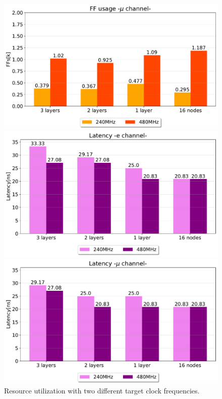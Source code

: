 \documentclass[../../main.tex]{subfiles}
\begin{document}
\begin{figure}[ht]
\begin{minipage}[b]{0.5\linewidth}
    \vspace{4ex}
  \end{minipage}%
  \begin{minipage}[b]{0.5\linewidth}
    \centering
    \includegraphics[width=.82\linewidth]{sections/05/Images/FF_usage1mu_@480.pdf} 
    \vspace{4ex}
  \end{minipage}
  \begin{minipage}[b]{0.5\linewidth}
    \centering
    \includegraphics[width=.82\linewidth]{sections/05/Images/Latency_1ele_@480.pdf} 
    \vspace{4ex}
  \end{minipage}%
  \begin{minipage}[b]{0.5\linewidth}
    \centering
    \includegraphics[width=.82\linewidth]{sections/05/Images/Latency_1mu_@480.pdf} 
    \vspace{4ex}
  \end{minipage}
  \caption{Resource utilization with two different target clock frequencies.}
  \label{fig:240vs480}
\end{figure}
    
\end{document}
